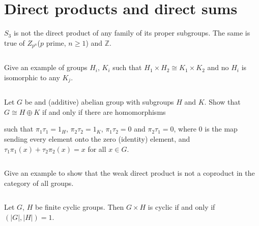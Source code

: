 \section{Direct products and direct sums}
\begin{ex}
    $S_{3}$ is not the direct product of any family of its proper subgroups. The same is true of $Z_{p^{n}}$($p$ prime, $n\geq 1$) and $\mathbb{Z}$.
\end{ex}

$$ $$

\begin{ex}
    Give an example of groups $H_{i}$, $K_{i}$ such that $H_{1}\times H_{2}\cong K_{1}\times K_{2}$ and no $H_{i}$ is isomorphic to any $K_{j}$.
\end{ex}

$$ $$

\begin{ex}
    Let $G$ be and (additive) abelian group with subgroups $H$ and $K$. Show that $G\cong H\oplus K$ if and only if there are homomorphisms 
    
    \begin{figure}[H]\centering
    \end{figure}
    such that $\pi_{1}\tau_{1}=1_{H}$, $\pi_{2}\tau_{2}=1_{K}$, $\pi_{1}\tau_{2}=0$ and $\pi_{2}\tau_{1}=0$, where 0 is the map sending every element onto the zero (identity) element, and $\tau_{1}\pi_{1}(x)+\tau_{2}\pi_{2}(x)=x$ for all $x\in G$.
\end{ex}

$$ $$

\begin{ex}
    Give an example to show that the weak direct product is not a coproduct in the category of all groups.
\end{ex}

$$ $$

\begin{ex}
    Let $G$, $H$ be finite cyclic groups. Then $G\times H$ is cyclic if and only if $(\left| G \right|, \left| H \right|  )=1$.
\end{ex}

